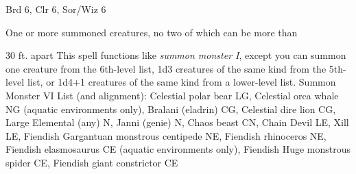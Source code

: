 
\begin{description*}
\item[Level:] Brd 6, Clr 6, Sor/Wiz 6
\item[Effect:] One or more summoned creatures, no two of which can be more than
\end{description*}

30 ft. apart
This spell functions like \textit{summon monster I}, except you can summon one
creature from the 6th-level list, 1d3 creatures of the same kind from the 5th-level
list, or 1d4+1 creatures of the same kind from a lower-level list.
Summon Monster VI List (and alignment): Celestial polar bear LG, Celestial orca whale NG (aquatic environments only), Bralani (eladrin) CG, Celestial dire lion CG, Large Elemental (any) N, Janni (genie) N, Chaos beast CN, Chain Devil LE, Xill LE, Fiendish Gargantuan monstrous centipede NE, Fiendish rhinoceros NE, Fiendish elasmosaurus CE (aquatic environments only), Fiendish Huge monstrous spider CE, Fiendish giant constrictor CE
